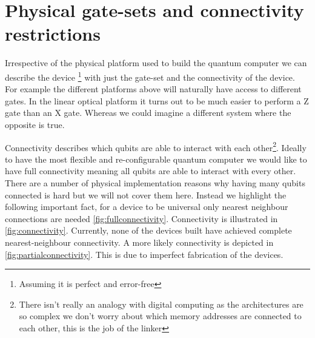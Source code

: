 
\section{Physical gate-sets and connectivity restrictions}

Irrespective of the physical platform used to build the quantum computer we can describe the device \footnote{Assuming it is perfect and error-free} with just the gate-set and the connectivity of the device. For example the different platforms above will naturally have access to different gates. In the linear optical platform it turns out to be much easier to perform a Z gate than an X gate. Whereas we could imagine a different system where the opposite is true.

Connectivity describes which qubits are able to interact with each other\footnote{There isn't really an analogy with digital computing as the architectures are so complex we don't worry about which memory addresses are connected to each other, this is the job of the linker}. Ideally to have the most flexible and re-configurable quantum computer we would like to have full connectivity meaning all qubits are able to interact with every other. There are a number of physical implementation reasons why having many qubits connected is hard but we will not cover them here. Instead we highlight the following important fact, for a device to be universal only nearest neighbour connections are needed \autoref{fig:fullconnectivity}. Connectivity is illustrated in \autoref{fig:connectivity}. Currently, none of the devices built have achieved complete nearest-neighbour connectivity. A more likely connectivity is depicted in \autoref{fig:partialconnectivity}. This is due to imperfect fabrication of the devices.

